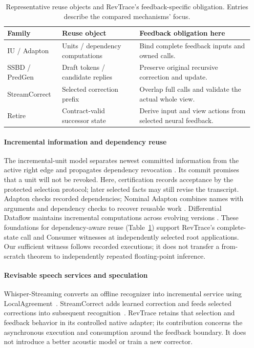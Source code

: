 \begin{table}[t]
\centering
\caption{Representative reuse objects and RevTrace's feedback-specific
obligation. Entries describe the compared mechanisms' focus.}
\label{tab:neighbor_objects}
\begingroup\small\setlength{\tabcolsep}{3pt}
\begin{tabular}{@{}>{\raggedright\arraybackslash}p{}>{\raggedright\arraybackslash}p{}>{\raggedright\arraybackslash}p{}@{}}
\toprule
Family & Reuse object & Feedback obligation here\\
\midrule
IU / Adapton & Units / dependency computations & Bind complete feedback
inputs and owned calls.\\
SSBD / PredGen & Draft tokens / candidate replies & Preserve original
recursive correction and update.\\
StreamCorrect & Selected correction prefix & Overlap full calls and
validate the actual whole view.\\
Retire & Contract-valid successor state & Derive input and view actions
from selected neural feedback.\\
\bottomrule
\end{tabular}\endgroup
\end{table}

\paragraph{Incremental information and dependency reuse}
The incremental-unit model separates newest committed information from
the active right edge and propagates dependency revocation
\cite{schlangen2011incremental}. Its commit promises that a unit will not
be revoked. Here, certification records acceptance by the protected
selection protocol; later selected facts may still revise the transcript.
Adapton checks recorded dependencies; Nominal Adapton combines names with
arguments and dependency checks to recover reusable work
\cite{hammer2014adapton,hammer2015names}. Differential Dataflow maintains
incremental computations across evolving versions
\cite{mcsherry2013differential}. These foundations for dependency-aware
reuse (Table~\ref{tab:neighbor_objects}) support RevTrace's complete-state
call and Consumer witnesses at independently selected root applications.
Our sufficient witness follows recorded executions; it does not transfer a
from-scratch theorem to independently repeated floating-point inference.

\paragraph{Revisable speech services and speculation}
Whisper-Streaming converts an offline recognizer into incremental service
using LocalAgreement~\cite{machacek2023whisperstreaming}. StreamCorrect
adds learned correction and feeds selected corrections into subsequent
recognition~\cite{vu2026streamcorrect}. RevTrace retains that selection and
feedback behavior in its controlled native adapter; its contribution
concerns the asynchronous execution and consumption around the feedback
boundary. It does not introduce a better acoustic model or train a new
corrector.

